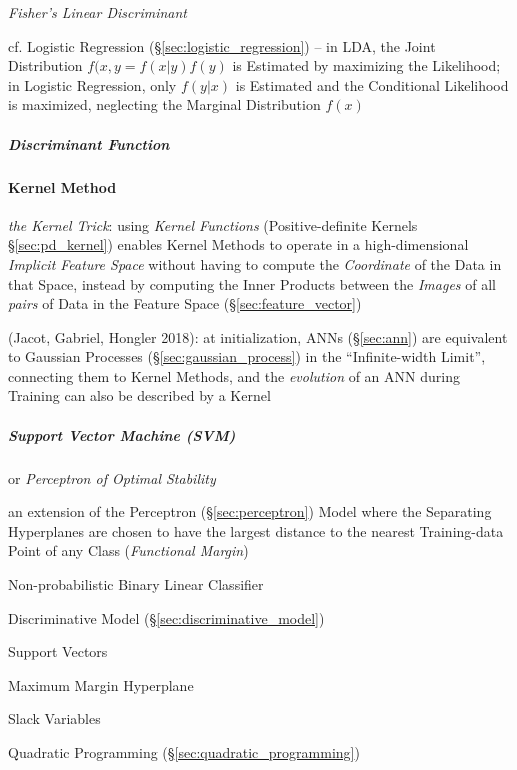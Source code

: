 \emph{Fisher's Linear Discriminant}

cf. Logistic Regression (\S\ref{sec:logistic_regression}) -- in LDA, the Joint
Distribution $f(x,y = f(x|y)f(y)$ is Estimated by maximizing the Likelihood; in
Logistic Regression, only $f(y|x)$ is Estimated and the Conditional Likelihood
is maximized, neglecting the Marginal Distribution $f(x)$



\subparagraph{Discriminant Function}\label{sec:discriminant_function}\hfill



\paragraph{Kernel Method}\label{sec:kernel_method}\hfill

\emph{the Kernel Trick}: using \emph{Kernel Functions} (Positive-definite
Kernels \S\ref{sec:pd_kernel}) enables Kernel Methods to operate in a
high-dimensional \emph{Implicit Feature Space} without having to compute the
\emph{Coordinate} of the Data in that Space, instead by computing the Inner
Products between the \emph{Images} of all \emph{pairs} of Data in the Feature
Space (\S\ref{sec:feature_vector})

(Jacot, Gabriel, Hongler 2018): at initialization, ANNs (\S\ref{sec:ann}) are
equivalent to Gaussian Processes (\S\ref{sec:gaussian_process}) in the
``Infinite-width Limit'', connecting them to Kernel Methods, and the
\emph{evolution} of an ANN during Training can also be described by a Kernel



\subparagraph{Support Vector Machine (SVM)}\label{sec:svm}\hfill

or \emph{Perceptron of Optimal Stability}

an extension of the Perceptron (\S\ref{sec:perceptron}) Model where the
Separating Hyperplanes are chosen to have the largest distance to the nearest
Training-data Point of any Class (\emph{Functional Margin})

Non-probabilistic Binary Linear Classifier

Discriminative Model (\S\ref{sec:discriminative_model})

Support Vectors

Maximum Margin Hyperplane

Slack Variables

Quadratic Programming (\S\ref{sec:quadratic_programming})



